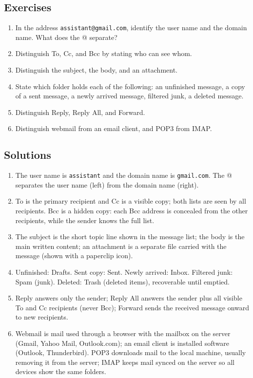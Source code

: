 \documentclass[11pt]{article}
\begin{document}
\subsection*{Exercises}
\begin{enumerate}[label=\arabic*.]
  \item In the address \texttt{assistant@gmail.com}, identify the user name
    and the domain name. What does the @ separate?
  \item Distinguish To, Cc, and Bcc by stating who can see whom.
  \item Distinguish the subject, the body, and an attachment.
  \item State which folder holds each of the following: an unfinished message,
    a copy of a sent message, a newly arrived message, filtered junk, a
    deleted message.
  \item Distinguish Reply, Reply All, and Forward.
  \item Distinguish webmail from an email client, and POP3 from IMAP.
\end{enumerate}

\subsection*{Solutions}
\begingroup\small
\begin{enumerate}[label=\arabic*.]
  \item The user name is \texttt{assistant} and the domain name is
    \texttt{gmail.com}. The @ separates the user name (left) from the domain
    name (right).
  \item To is the primary recipient and Cc is a visible copy; both lists are
    seen by all recipients. Bcc is a hidden copy: each Bcc address is concealed
    from the other recipients, while the sender knows the full list.
  \item The subject is the short topic line shown in the message list; the
    body is the main written content; an attachment is a separate file carried
    with the message (shown with a paperclip icon).
  \item Unfinished: Drafts. Sent copy: Sent. Newly arrived: Inbox. Filtered
    junk: Spam (junk). Deleted: Trash (deleted items), recoverable until
    emptied.
  \item Reply answers only the sender; Reply All answers the sender plus all
    visible To and Cc recipients (never Bcc); Forward sends the received
    message onward to new recipients.
  \item Webmail is mail used through a browser with the mailbox on the
    server (Gmail, Yahoo Mail, Outlook.com); an email client is installed
    software (Outlook, Thunderbird). POP3 downloads mail to the local
    machine, usually removing it from the server; IMAP keeps mail synced on
    the server so all devices show the same folders.
\end{enumerate}
\endgroup
\end{document}
